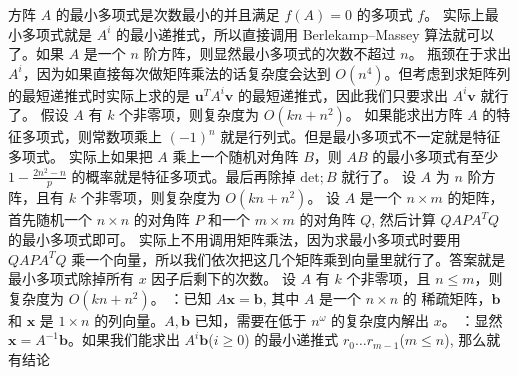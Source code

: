 {{}
\markdownRendererSectionEnd \markdownRendererSectionBegin
{}\markdownRendererInterblockSeparator
{}方阵 $A$ 的最小多项式是次数最小的并且满足 $f(A) = 0$ 的多项式 $f$。\markdownRendererParagraphSeparator
{}实际上最小多项式就是 ${A^i}$ 的最小递推式，所以直接调用 Berlekamp–Massey 算法就可以了。如果 $A$ 是一个 $n$ 阶方阵，则显然最小多项式的次数不超过 $n$。\markdownRendererParagraphSeparator
{}瓶颈在于求出 $A^i$，因为如果直接每次做矩阵乘法的话复杂度会达到 $O(n^4)$。但考虑到求矩阵列的最短递推式时实际上求的是 ${\boldsymbol{u}^T A^i \boldsymbol{v}}$ 的最短递推式，因此我们只要求出 $A^i \boldsymbol{v}$ 就行了。\markdownRendererParagraphSeparator
{}假设 $A$ 有 $k$ 个非零项，则复杂度为 $O(kn + n^2)$。\markdownRendererInterblockSeparator
{}
\markdownRendererSectionEnd \markdownRendererSectionBegin
{}\markdownRendererInterblockSeparator
{}如果能求出方阵 $A$ 的特征多项式，则常数项乘上 $(-1)^n$ 就是行列式。但是最小多项式不一定就是特征多项式。\markdownRendererParagraphSeparator
{}实际上如果把 $A$ 乘上一个随机对角阵 $B$，则 $AB$ 的最小多项式有至少 $1 - \frac {2n^2 - n} p$ 的概率就是特征多项式。最后再除掉 $\text{det};B$ 就行了。\markdownRendererParagraphSeparator
{}设 $A$ 为 $n$ 阶方阵，且有 $k$ 个非零项，则复杂度为 $O(kn + n ^ 2)$。\markdownRendererInterblockSeparator
{}
\markdownRendererSectionEnd \markdownRendererSectionBegin
{}\markdownRendererInterblockSeparator
{}设 $A$ 是一个 $n\times m$ 的矩阵，首先随机一个 $n\times n$ 的对角阵 $P$ 和一个 $m\times m$ 的对角阵 $Q$, 然后计算 $Q A P A^T Q$ 的最小多项式即可。\markdownRendererParagraphSeparator
{}实际上不用调用矩阵乘法，因为求最小多项式时要用 $Q A P A^T Q$ 乘一个向量，所以我们依次把这几个矩阵乘到向量里就行了。答案就是最小多项式除掉所有 $x$ 因子后剩下的次数。\markdownRendererParagraphSeparator
{}设 $A$ 有 $k$ 个非零项，且 $n \le m$，则复杂度为 $O(kn + n ^ 2)$。\markdownRendererInterblockSeparator
{}
\markdownRendererSectionEnd \markdownRendererSectionBegin
{}\markdownRendererInterblockSeparator
{}：已知 $A \mathbf x = \mathbf b$, 其中 $A$ 是一个 $n \times n$ 的  稀疏矩阵，$\mathbf b$ 和 $\mathbf x$ 是 $1\times n$ 的列向量。$A, \mathbf b$ 已知，需要在低于 $n^\omega$ 的复杂度内解出 $x$。\markdownRendererParagraphSeparator
{}：显然 $\mathbf x = A^{-1} \mathbf b$。如果我们能求出 ${A^i \mathbf b}$($i \ge 0$) 的最小递推式 ${r_0 \dots r_{m - 1}}$($m \le n$), 那么就有结论\markdownRendererParagraphSeparator
}

